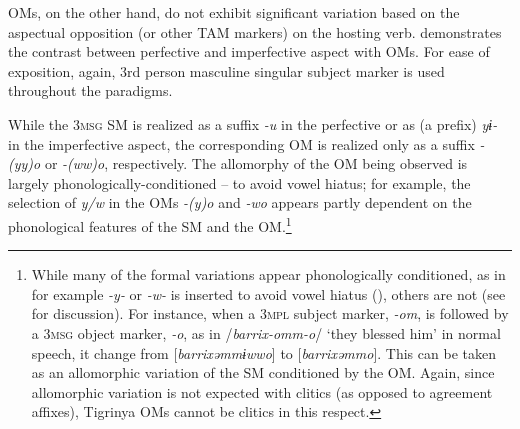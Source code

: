 \documentclass[output=paper]{langscibook}
\begin{document}
OMs, on the other hand, do not exhibit significant variation based on the aspectual opposition (or other TAM markers) on the hosting verb.
 demonstrates the contrast between perfective and imperfective aspect with OMs. For ease of exposition, again, 3rd person masculine singular subject marker is used throughout the paradigms.

\begin{table}
\caption{Aspectual distinction of Tigrinya OMs\label{tab:Gebregziabher:Table3}}
\end{table}

While the {\scshape 3msg} SM is realized as a suffix \emph{-u} in the perfective or as (a prefix) \emph{yɨ-} in the imperfective aspect, the corresponding OM is realized only as a suffix \mbox{\emph{-(yy)o}} or \emph{-(ww)o}, respectively. The allomorphy of the OM being observed is largely phonologically-conditioned -- to avoid vowel hiatus; for example, the selection of \emph{y/w} in the OMs \emph{-(y)o} and \emph{-wo} appears partly dependent on the phonological features of the SM and the OM.\footnote{While many of the formal variations appear phonologically conditioned, as in for example \mbox{\emph{-y-}} or \mbox{\emph{-w-}} is inserted to avoid vowel hiatus (\citealt{berhane91}), others are not (see \citealt{gebre13b} for discussion). For instance, when a {\scshape 3mpl} subject marker, {\emph{-om}}, is followed by a {\scshape 3msg} object marker, {\emph{-o}}, as in /{\emph{barrix-omm-o}}/ `they blessed him' in normal speech, it change from [{\emph{barrixəmmɨwwo}}] to [{\emph{barrixəmmo}}]. This can be taken as an allomorphic variation of the SM conditioned by the OM. Again, since allomorphic variation is not expected with clitics (as opposed to agreement affixes), Tigrinya OMs cannot be clitics in this respect.}
\end{document}
